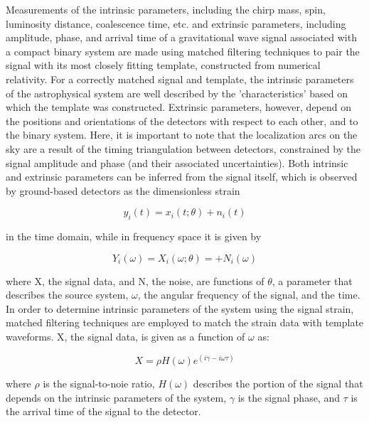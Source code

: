 \documentclass{article}
\begin{document}
Measurements of the intrinsic parameters, including the chirp mass, spin, luminosity distance, coalescence time, etc. and extrinsic parameters, including amplitude, phase, and arrival time of a gravitational wave signal associated with a compact binary system are made using matched filtering techniques to pair the signal with its most closely fitting template, constructed from numerical relativity.  For a correctly matched signal and template, the intrinsic parameters of the astrophysical system are well described by the 'characteristics' based on which the template was constructed.  Extrinsic parameters, however, depend on the positions and orientations of the detectors with respect to each other, and to the binary system.  Here, it is important to note that the localization arcs on the sky are a result of the timing triangulation between detectors, constrained by the signal amplitude and phase (and their associated uncertainties).  Both intrinsic and extrinsic parameters can be inferred from the signal itself, which is observed by ground-based detectors as the dimensionless strain

\begin{equation}    y_i(t) = x_i(t;\theta) + n_i(t) \end{equation}

in the time domain, while in frequency space it is given by 

\begin{equation} Y_i(\omega) = X_i(\omega; \theta) = + N_i(\omega) \end{equation}

where X, the signal data, and N, the noise, are functions of $\theta$, a parameter that describes the source system, $\omega$, the angular frequency of the signal, and the time. In order to determine intrinsic parameters of the system using the signal strain, matched filtering techniques are employed to match the strain data with template waveforms.  X, the signal data, is given as a function of $\omega$ as:

\begin{equation} X = \rho H(\omega)e^(i\gamma - i\omega\tau) \end{equation}

where $\rho$ is the signal-to-noie ratio, $H(\omega)$ describes the portion of the signal that depends on the intrinsic parameters of the system, $\gamma$ is the signal phase, and $\tau$ is the arrival time of the signal to the detector.
\end{document}
